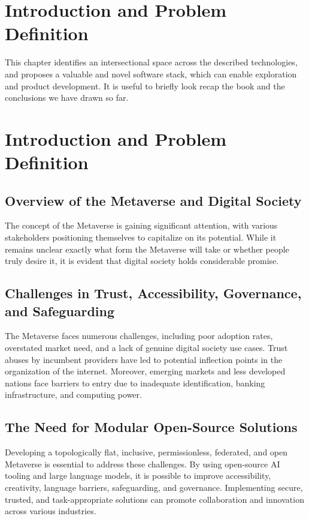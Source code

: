 \section{Introduction and Problem Definition}

This chapter identifies an intersectional space across the described technologies, and proposes a valuable and novel software stack, which can enable exploration  and product development. It is useful to briefly look recap the book and the conclusions we have drawn so far.

%

\section{Introduction and Problem Definition}
\subsection{Overview of the Metaverse and Digital Society}
The concept of the Metaverse is gaining significant attention, with various stakeholders positioning themselves to capitalize on its potential. While it remains unclear exactly what form the Metaverse will take or whether people truly desire it, it is evident that digital society holds considerable promise.

\subsection{Challenges in Trust, Accessibility, Governance, and Safeguarding}
The Metaverse faces numerous challenges, including poor adoption rates, overstated market need, and a lack of genuine digital society use cases. Trust abuses by incumbent providers have led to potential inflection points in the organization of the internet. Moreover, emerging markets and less developed nations face barriers to entry due to inadequate identification, banking infrastructure, and computing power.

\subsection{The Need for Modular Open-Source Solutions}
Developing a topologically flat, inclusive, permissionless, federated, and open Metaverse is essential to address these challenges. By using open-source AI tooling and large language models, it is possible to improve accessibility, creativity, language barriers, safeguarding, and governance. Implementing secure, trusted, and task-appropriate solutions can promote collaboration and innovation across various industries.

